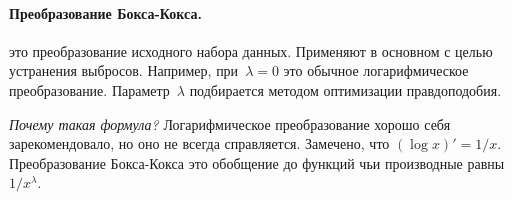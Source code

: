 \documentclass[../handbook.tex]{subfiles}
\begin{document}
\paragraph{Преобразование Бокса-Кокса.} 
это преобразование исходного набора
данных. Применяют в основном с целью устранения выбросов. Например,
при~$\lambda = 0$ это обычное логарифмическое преобразование.
Параметр~$\lambda$ подбирается методом оптимизации правдоподобия.

{\it Почему такая формула?} Логарифмическое преобразование хорошо себя
зарекомендовало, но оно не всегда справляется. Замечено, что $(\log x)' =
1/x$. Преобразование Бокса-Кокса это обобщение до функций чьи производные
равны $1/x^\lambda$.
\end{document}
